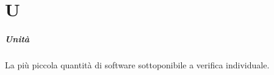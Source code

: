 \chapter{U}
\paragraph{Unità}
La più piccola quantità di software sottoponibile a verifica individuale.